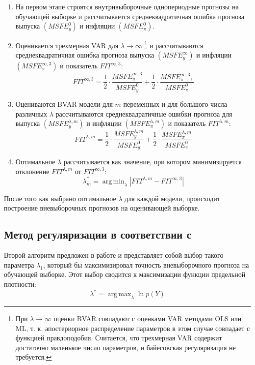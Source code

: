 \documentclass[11pt]{article} %
\DeclareMathOperator*{\argmax}{arg\,max}
\DeclareMathOperator*{\argmin}{arg\,min}
\begin{document}
\begin{enumerate}
\item На первом этапе  строятся внутривыборочные однопериодные прогнозы на обучающей выборке и рассчитывается среднеквадратичная ошибка прогноза выпуска $(MSFE_y^{0})$ и инфляции $(MSFE_{\pi}^{0})$.
\item Оценивается трехмерная VAR для $\lambda\to \infty$ \footnote{При $\lambda\to \infty$ оценки BVAR совпадают с оценками VAR методами OLS или ML, т. к. апостериорное распределение параметров в этом случае совпадает с функцией правдоподобия. Считается, что трехмерная VAR содержит достаточно маленькое число параметров, и байесовская регуляризация не требуется.} и рассчитываются среднеквадратичная ошибка прогноза выпуска $(MSFE_y^{\infty})$ и инфляции $(MSFE_{\pi}^{\infty,3})$ и показатель $FIT^{\infty,3}$:
\begin{equation}
FIT^{\infty,3}=\frac{1}{2}\cdot\frac{MSFE_y^{\infty,3}}{MSFE^0_y} + \frac{1}{2}\cdot\frac{MSFE_{\pi}^{\infty,3},}{MSFE^0_{\pi}}
\end{equation}
\item Оцениваются BVAR модели для $m$ переменных и для большого числа различных $\lambda$ рассчитываются среднеквадратичные ошибки прогноза для выпуска $(MSFE_y^{\lambda,m})$ и инфляции $(MSFE_{\pi}^{\lambda,m})$ и показатель $FIT^{{\lambda,m}}$: 
\begin{equation}
FIT^{\lambda,m}=\frac{1}{2}\cdot\frac{MSFE_y^{\lambda,m}}{MSFE^0_y} + \frac{1}{2}\cdot\frac{MSFE_{\pi}^{\lambda,m}}{MSFE^0_{\pi}}
\end{equation}
\item Оптимальное $\lambda$ рассчитывается как значение, при котором минимизируется отклонение $FIT^{\lambda,m}$ от $FIT^{\infty,3}$:
\begin{equation}
\lambda^*_m=\argmin_{\lambda} |FIT^{\lambda, m}-FIT^{\infty,3}| 
\end{equation}
\end{enumerate}
После того как выбрано оптимальное $\lambda$ для каждой модели, происходит построение вневыборочных прогнозов на оценивающей выборке.


\subsection{Метод регуляризации в соответствии с  \cite{doan_al_1984}}

Второй алгоритм предложен в работе \cite{doan_al_1984} и представляет собой выбор такого параметра $\lambda_1$, который бы максимизировал точность вневыборочного прогноза на обучающей выборке. Этот выбор сводится к максимизации функции предельной плотности:
\begin{equation}
\lambda^*=\argmax_{\lambda} \ln p(Y)
\end{equation}
\end{document}
